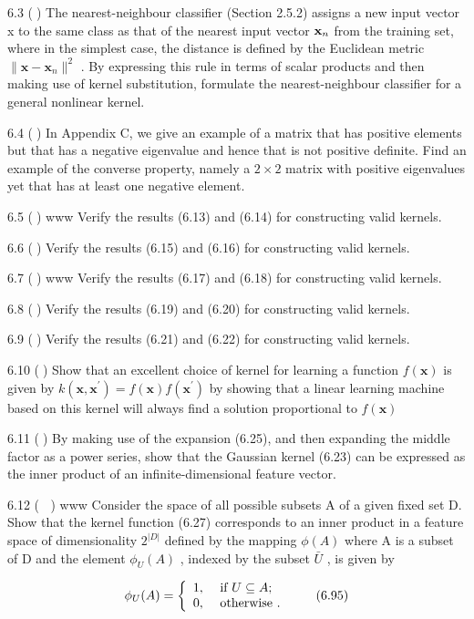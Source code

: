 \documentclass[
  10
]{article}
\begin{document}
6.3 () The nearest-neighbour classifier (Section 2.5.2) assigns a new
input vector x to the same class as that of the nearest input vector
\({ \bf x } _ { n }\) from the training set, where in the simplest case,
the distance is defined by the Euclidean metric
\(\| \mathbf { x } - \mathbf { x } _ { n } \| ^ { 2 }\) . By expressing
this rule in terms of scalar products and then making use of kernel
substitution, formulate the nearest-neighbour classifier for a general
nonlinear kernel.

6.4 () In Appendix C, we give an example of a matrix that has positive
elements but that has a negative eigenvalue and hence that is not
positive definite. Find an example of the converse property, namely a
\(2 \times 2\) matrix with positive eigenvalues yet that has at least
one negative element.

6.5 () www Verify the results (6.13) and (6.14) for constructing valid
kernels.

6.6 () Verify the results (6.15) and (6.16) for constructing valid
kernels.

6.7 () www Verify the results (6.17) and (6.18) for constructing valid
kernels.

6.8 () Verify the results (6.19) and (6.20) for constructing valid
kernels.

6.9 () Verify the results (6.21) and (6.22) for constructing valid
kernels.

6.10 () Show that an excellent choice of kernel for learning a function
\(f ( \mathbf { x } )\) is given by
\(k ( \mathbf { x } , \mathbf { x } ^ { \prime } ) = f ( \mathbf { x } ) f ( \mathbf { x } ^ { \prime } )\)
by showing that a linear learning machine based on this kernel will
always find a solution proportional to \(f ( \mathbf { x } )\)

6.11 () By making use of the expansion (6.25), and then expanding the
middle factor as a power series, show that the Gaussian kernel (6.23)
can be expressed as the inner product of an infinite-dimensional feature
vector.

6.12 ( ) www Consider the space of all possible subsets A of a given
fixed set D. Show that the kernel function (6.27) corresponds to an
inner product in a feature space of dimensionality \(2 ^ { | D | }\)
defined by the mapping \(\phi ( A )\) where A is a subset of D and the
element \(\phi _ { U } ( A )\) , indexed by the subset \(\bar { U }\) ,
is given by

\[
\phi_ {U} (A) = \left\{ \begin{array}{l l} 1, & \text { if } U \subseteq A; \\ 0, & \text { otherwise }. \end{array} \right.\tag{6.95}
\]
\end{document}
